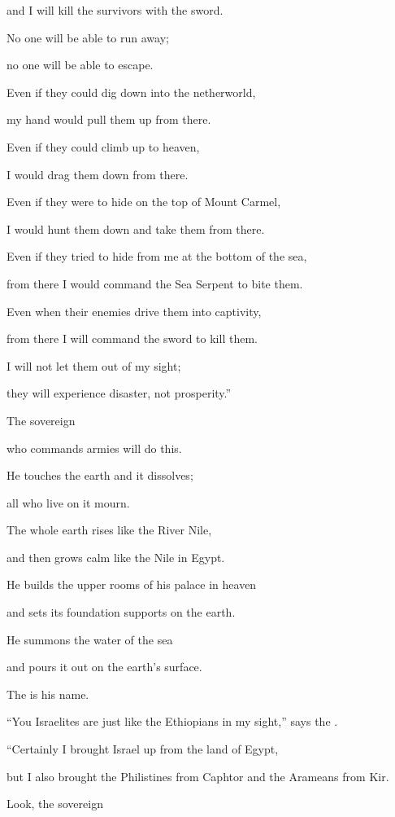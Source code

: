 {\par }{\Q and I will kill
the survivors
with the sword.
\par }{\Q No
one will be able to run
away;
\par }{\Q no
one will be able to escape.
\par }{\Q {}Even if
they could dig
down into the netherworld,
\par }{\Q my hand
would pull
them up
from there.
\par }{\Q Even if
they could climb up
to heaven,
\par }{\Q I would drag them down
from there.
\par }{\Q {}Even if
they were to hide
on the top
of Mount Carmel,
\par }{\Q I would hunt
them down
and take
them from
there.
\par }{\Q Even if
they tried
to hide
from
me
at the bottom
of the sea,
\par }{\Q from
there
I
would command
the
Sea Serpent
to bite them.
\par }{\Q {}Even
when
their enemies
drive them into captivity,
\par }{\Q from there
I will command
the sword
to kill
them.
\par }{\Q I
will not let
them out of my sight;
\par }{\Q they will experience disaster,
not
prosperity.”
\par }{\Q {}The sovereign

{}
who commands armies
will do this.

\par }{\Q He touches
the earth
and it dissolves;
\par }{\Q all
who live
on it mourn.
\par }{\Q The whole
earth rises
like the River Nile,
\par }{\Q and then grows calm
like the Nile
in Egypt.
\par }{\Q {}He builds
the upper rooms
of his palace in heaven
\par }{\Q and sets
its foundation
supports
on
the earth.
\par }{\Q He summons
the water
of the sea
\par }{\Q and pours
it out
on
the earth’s
surface.
\par }{\Q The
{}
is his name.
\par }{\Q {}“You Israelites
are just like the Ethiopians
in my sight,” says
the {}.
\par }{\Q “Certainly I brought Israel
up
from the land
of Egypt,
\par }{\Q but I also brought the Philistines
from Caphtor
and the Arameans
from Kir.
\par }{\Q {}Look,
the sovereign

}
